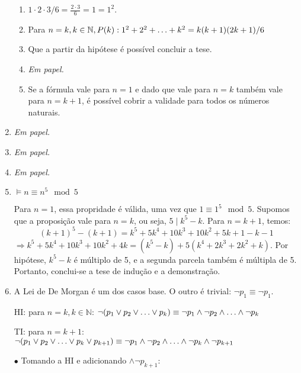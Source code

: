 \documentclass{article}
\begin{document}
\begin{enumerate}
\begin{enumerate}
		      \item \( 1 \cdot 2 \cdot 3 / 6 = \frac{2 \cdot 3}{6} = 1 = 1^2 \).

		      \item Para \( n = k, k \in \mathbb{N}, P(k) : 1^2 + 2^2 + \mathellipsis + k^2 = k(k+1)(2k+1)/6 \)

		      \item Que a partir da hipótese é possível concluir a tese.

		      \item \textit{Em papel.}

		      \item Se a fórmula vale para \( n = 1 \) e dado que vale para \( n = k \) também vale para \( n = k + 1 \), é possível cobrir a validade para todos os números naturais.

	      \end{enumerate}

	\item \textit{Em papel.}

	\item \textit{Em papel.}

	\item \textit{Em papel.}

	\item \( \models n \equiv n^5 \mod 5 \)

	      Para \( n = 1 \), essa propridade é válida, uma vez que \( 1 \equiv 1^5 \mod 5 \). Supomos que a proposição vale para \( n = k \), ou seja, \( 5 \mid k^5 - k  \). Para \( n = k + 1 \), temos:
	      \[ (k+1)^5 - (k+1) = k^5 + 5k^4 + 10k^3 + 10k^2 + 5k + 1 - k - 1  \]
	      \( \Rightarrow  k^5 + 5k^4 + 10k^3 + 10k^2 + 4k = (k^5 - k) + 5(k^4 + 2k^3 + 2k^2 + k)\). Por hipótese, \( k^5 - k \) é múltiplo de 5, e a segunda parcela também é múltipla de 5. Portanto, conclui-se a tese de indução e a demonstração.

	\item A Lei de De Morgan é um dos casos base. O outro é trivial: \( \neg p_1 \equiv \neg p_1 \).

	      HI: para \( n = k, k  \in \mathbb{N} \): \( \neg (p_1 \lor p_2 \lor \mathellipsis \lor p_k) \equiv \neg p_1 \land \neg p_2 \land \mathellipsis \land \neg p_k \)

	      TI: para \( n = k + 1 \): \( \neg (p_1 \lor p_2 \lor \mathellipsis \lor p_k \lor p_{k+1}) \equiv \neg p_1 \land \neg p_2 \land \mathellipsis \land \neg p_k \land \neg p_{k+1}\)

	      \( \bullet \) Tomando a HI e adicionando \( \land \neg p_{k+1} \):


\end{enumerate}
\end{document}
